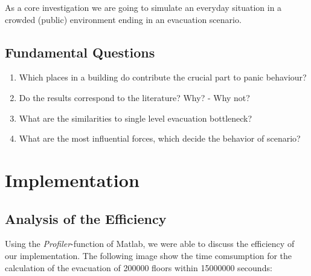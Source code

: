 \documentclass[11pt]{article}
\begin{document}
As a core investigation we are going to simulate an everyday situation in a crowded (public) environment ending in an evacuation scenario.

\subsection{Fundamental Questions}

\begin{enumerate}
\item Which places in a building do contribute the crucial part to panic behaviour?
\item Do the results correspond to the literature? Why? - Why not?
\item What are the similarities to single level evacuation bottleneck?
\item What are the most influential forces, which decide the behavior of scenario?

 
\end{enumerate}





\section{Implementation}


\subsection{Analysis of the Efficiency}



Using the \textit{Profiler}-function of Matlab, we were able to discuss the efficiency of our implementation. The following image show the time comsumption for the calculation of the evacuation of 200000 floors within 15000000 secounds: %

\medskip
\end{document}
